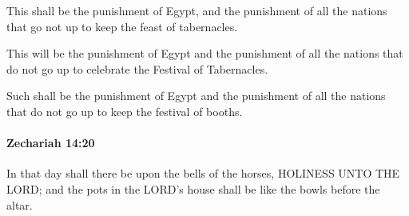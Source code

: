 			\begin{versebox}
					\item[BHS] 
					\item[LXX] 
					\item[ASV] This shall be the punishment of Egypt, and the punishment of all the nations that go not up to keep the feast of tabernacles.
					\item[NIV] This will be the punishment of Egypt and the punishment of all the nations that do not go up to celebrate the Festival of Tabernacles.
					\item[NRSV] Such shall be the punishment of Egypt and the punishment of all the nations that do not go up to keep the festival of booths.
			\end{versebox}

		\paragraph{Zechariah 14:20} %
			\label{ZECHARIAH-14-20}

			In that day shall there be upon the bells of the horses, HOLINESS UNTO THE LORD; and the pots in the LORD’s house shall be like the bowls before the altar.

